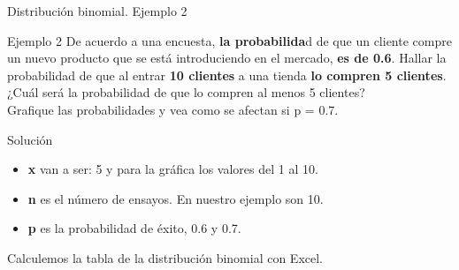 \documentclass[11pt]{beamer}
\begin{document}
          \begin{frame}{Distribución binomial. Ejemplo 2}
            \begin{block}{Ejemplo 2}
                De acuerdo a una encuesta, \textbf{la probabilida}d de que un cliente compre un nuevo producto que se está introduciendo en el mercado,\textbf{ es de 0.6}. Hallar la probabilidad de que al entrar \textbf{10 clientes} a una tienda \textbf{lo compren 5 clientes}. ¿Cuál será la probabilidad de que lo compren al menos 5 clientes? \\
                Grafique las probabilidades y vea como se afectan si p = 0.7.
            \end{block}
            \begin{block}{Solución}
               \begin{itemize}
                   \item \textbf{x} \pause van a ser: 5 y para la gráfica los valores del 1 al 10.
                   \item \textbf{n} \pause es el número de ensayos. En nuestro ejemplo son 10.
                   \item \textbf{p} \pause es la probabilidad de éxito, 0.6 y 0.7.
               \end{itemize}
               Calculemos la tabla de la distribución binomial con Excel.
            \end{block}
          \end{frame}
\end{document}
